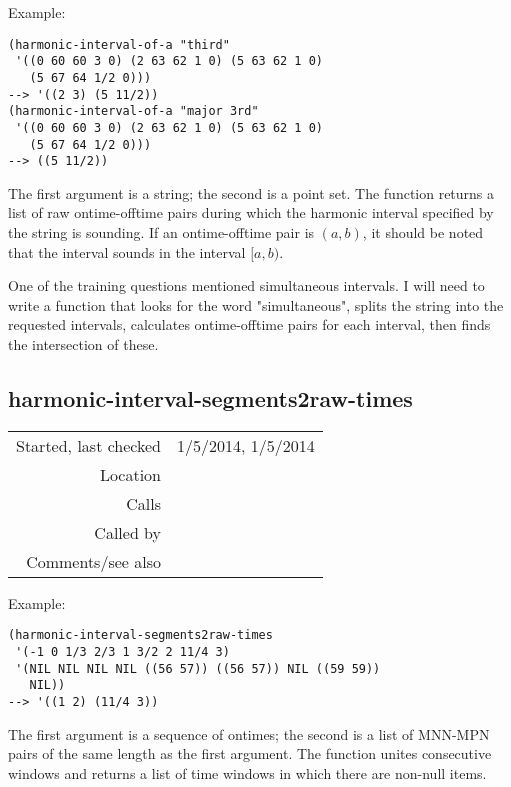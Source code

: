 \vspace{0.5cm}
\noindent Example:
\begin{verbatim}
(harmonic-interval-of-a "third"
 '((0 60 60 3 0) (2 63 62 1 0) (5 63 62 1 0)
   (5 67 64 1/2 0)))
--> '((2 3) (5 11/2))
(harmonic-interval-of-a "major 3rd"
 '((0 60 60 3 0) (2 63 62 1 0) (5 63 62 1 0)
   (5 67 64 1/2 0)))
--> ((5 11/2))
\end{verbatim}

\noindent The first argument is a string; the second
is a point set. The function returns a list of raw
ontime-offtime pairs during which the harmonic
interval specified by the string is sounding. If an
ontime-offtime pair is $(a, b)$, it should be noted
that the interval sounds in the interval $[a, b)$.

One of the training questions mentioned simultaneous
intervals. I will need to write a function that looks
for the word "simultaneous", splits the string into
the requested intervals, calculates ontime-offtime
pairs for each interval, then finds the intersection
of these.


\subsection*{harmonic-interval-segments2raw-times}\label{fun:harmonic-interval-segments2raw-times}

\vspace{0.3cm}
\begin{tabular}{r|p{8cm}}
Started, last checked & 1/5/2014, 1/5/2014 \\
Location & \nameref{sec:pitches-intervals-durations} \\
Calls & \\
Called by & \nameref{fun:labelled-listed-segments2datapoints} \\
Comments/see also &
\end{tabular}

\vspace{0.5cm}
\noindent Example:
\begin{verbatim}
(harmonic-interval-segments2raw-times
 '(-1 0 1/3 2/3 1 3/2 2 11/4 3)
 '(NIL NIL NIL NIL ((56 57)) ((56 57)) NIL ((59 59))
   NIL))
--> '((1 2) (11/4 3))
\end{verbatim}

\noindent The first argument is a sequence of ontimes;
the second is a list of MNN-MPN pairs of the same
length as the first argument. The function unites
consecutive windows and returns a list of time windows
in which there are non-null items.


